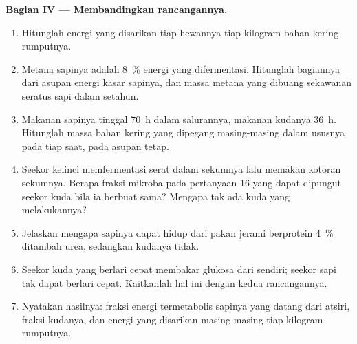 \begin{problem}
\medskip
\noindent\textbf{Bagian IV --- Membandingkan rancangannya.}
\begin{enumerate}[resume]
  \item Hitunglah energi yang disarikan tiap hewannya tiap kilogram
        bahan kering rumputnya.
  \item Metana sapinya adalah \qty{8}{\%} energi yang difermentasi.
        Hitunglah bagiannya dari asupan energi kasar sapinya, dan
        massa metana yang dibuang sekawanan seratus sapi dalam
        setahun.
  \item Makanan sapinya tinggal \qty{70}{h} dalam salurannya, makanan
        kudanya \qty{36}{h}. Hitunglah massa bahan kering yang dipegang
        masing-masing dalam ususnya pada tiap saat, pada asupan tetap.
  \item Seekor kelinci memfermentasi serat dalam sekumnya lalu memakan
        kotoran sekumnya. Berapa fraksi  mikroba pada
        pertanyaan 16 yang dapat dipungut seekor kuda bila ia berbuat
        sama? Mengapa tak ada kuda yang melakukannya?
  \item Jelaskan mengapa sapinya dapat hidup dari pakan jerami
        berprotein \qty{4}{\%} ditambah urea, sedangkan kudanya tidak.
  \item Seekor kuda yang berlari cepat membakar glukosa dari
         sendiri; seekor sapi tak dapat berlari cepat.
        Kaitkanlah hal ini dengan kedua rancangannya.
  \item Nyatakan hasilnya: fraksi energi termetabolis sapinya yang
        datang dari  atsiri, fraksi kudanya, dan energi yang
        disarikan masing-masing tiap kilogram rumputnya.
\end{enumerate}
\end{problem}
